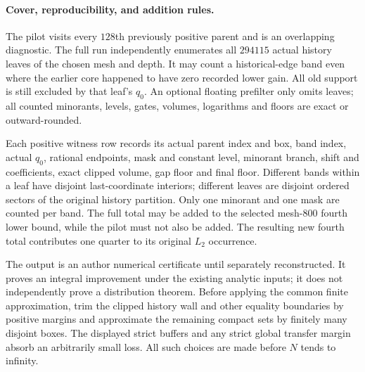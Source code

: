 \paragraph{Cover, reproducibility, and addition rules.}
The pilot visits every $128$th previously positive parent and is an
overlapping diagnostic. The full run independently enumerates all
$294115$ actual history leaves of the chosen mesh and depth. It may
count a historical-edge band even where the earlier core happened
to have zero recorded lower gain. All old support is still excluded
by that leaf's $q_0$. An optional floating prefilter only omits leaves;
all counted minorants, levels, gates, volumes, logarithms and floors
are exact or outward-rounded.

Each positive witness row records its actual parent index and box,
band index, actual $q_0$, rational endpoints, mask and constant level,
minorant branch, shift and coefficients, exact clipped volume,
gap floor and final floor. Different bands within a leaf have
disjoint last-coordinate interiors; different leaves are disjoint
ordered sectors of the original history partition. Only one
minorant and one mask are counted per band. The full total may be
added to the selected mesh-$800$ fourth lower bound, while the pilot
must not also be added. The resulting new fourth total contributes
one quarter to its original $L_2$ occurrence.

The output is an author numerical certificate until separately
reconstructed. It proves an integral improvement under the existing
analytic inputs; it does not independently prove a distribution
theorem. Before applying the common finite approximation, trim the
clipped history wall and other equality boundaries by positive
margins and approximate the remaining compact sets by finitely
many disjoint boxes. The displayed strict buffers and any strict
global transfer margin absorb an arbitrarily small loss. All such
choices are made before $N$ tends to infinity.
